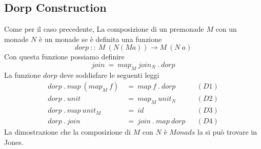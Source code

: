 \subsection{Dorp Construction}
\label{dorp_construction}

Come per il caso precedente,
La composizione di un premonade $M$ con un monade $N$ è un monade se è definita
una funzione
\begin{equation*}
  dorp\ ::\ M\ (N  (M  a)) \to M\ (N\ a)
\end{equation*}
Con questa funzione possiamo definire
\begin{equation*}
  join\ =\ map_M\ join_N\ .\ dorp
\end{equation*}
La funzione $dorp$ deve soddisfare le seguenti leggi
\begin{align*}
  dorp\ .\ map\ (map_M\ f)\ &=\ map\ f\ .\ dorp &&(D1)\\
  dorp\ .\ unit\ &=\ map_M\ unit_N && (D2)\\
  dorp\ .\ map\ unit_M\ &=\ id && (D3)\\
  dorp\ .\ join\ &=\ join\ .\ map\ dorp &&(D4)
\end{align*}
La dimostrazione che la composizione di $M$ con $N$ è $Monads$ la si può
trovare in Jones\cite{jones0}.\newline

